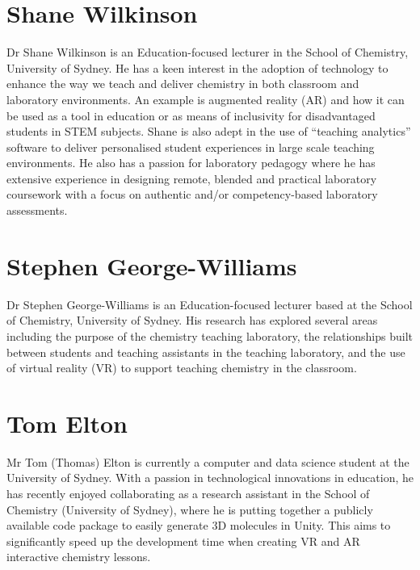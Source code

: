 \documentclass[
]{book}
\begin{document}
\hypertarget{shane-wilkinson}{%
\section*{Shane Wilkinson}\label{shane-wilkinson}}

Dr Shane Wilkinson is an Education-focused lecturer in the School of Chemistry, University of Sydney. He has a keen interest in the adoption of technology to enhance the way we teach and deliver chemistry in both classroom and laboratory environments. An example is augmented reality (AR) and how it can be used as a tool in education or as means of inclusivity for disadvantaged students in STEM subjects. Shane is also adept in the use of ``teaching analytics'' software to deliver personalised student experiences in large scale teaching environments. He also has a passion for laboratory pedagogy where he has extensive experience in designing remote, blended and practical laboratory coursework with a focus on authentic and/or competency-based laboratory assessments.

\hypertarget{stephen-george-williams}{%
\section*{Stephen George-Williams}\label{stephen-george-williams}}

Dr Stephen George-Williams is an Education-focused lecturer based at the School of Chemistry, University of Sydney. His research has explored several areas including the purpose of the chemistry teaching laboratory, the relationships built between students and teaching assistants in the teaching laboratory, and the use of virtual reality (VR) to support teaching chemistry in the classroom.

\hypertarget{tom-elton}{%
\section*{Tom Elton}\label{tom-elton}}

Mr Tom (Thomas) Elton is currently a computer and data science student at the University of Sydney. With a passion in technological innovations in education, he has recently enjoyed collaborating as a research assistant in the School of Chemistry (University of Sydney), where he is putting together a publicly available code package to easily generate 3D molecules in Unity. This aims to significantly speed up the development time when creating VR and AR interactive chemistry lessons.
\end{document}
